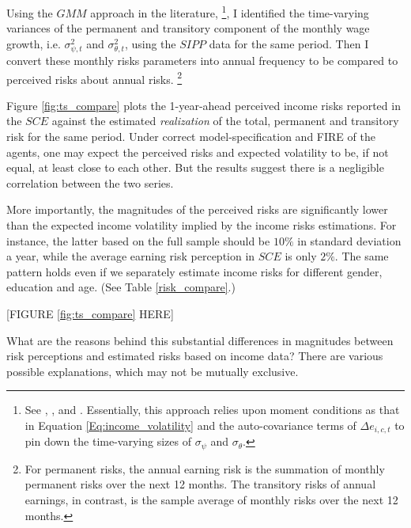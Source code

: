 Using the $GMM$ approach in the literature, \footnote{See \cite{carroll1997nature}, \cite{meghir2004income}, and \cite{blundell_consumption_2008}. Essentially, this approach relies upon moment conditions as that in Equation \ref{Eq:income_volatility} and the auto-covariance terms of $\Delta e_{i,c,t}$ to pin down the time-varying sizes of $\sigma_{\psi}$ and $\sigma_{\theta}$.}, I identified the time-varying variances of the permanent and transitory component of the monthly wage growth, i.e. $\sigma^2_{\psi,t}$ and $\sigma^2_{\theta,t}$, using the $SIPP$ data for the same period. Then I convert these monthly risks parameters into annual frequency to be compared to perceived risks about annual risks. \footnote{For permanent risks, the annual earning risk is the summation of monthly permanent risks over the next 12 months. The transitory risks of annual earnings, in contrast, is the sample average of monthly risks over the next 12 months.}


Figure \ref{fig:ts_compare} plots the 1-year-ahead perceived income risks reported in the $SCE$ against the estimated \emph{realization} of the total, permanent and transitory risk for the same period. Under correct model-specification and FIRE of the agents, one may expect the perceived risks and expected volatility to be, if not equal, at least close to each other. But the results suggest there is a negligible correlation between the two series. 

More importantly, the magnitudes of the perceived risks are significantly lower than the expected income volatility implied by the income risks estimations. For instance, the latter based on the full sample should be $10\%$ in standard deviation a year, while the average earning risk perception in $SCE$ is only $2\%$. The same pattern holds even if we separately estimate income risks for different gender, education and age. (See Table \ref{risk_compare}.)

\begin{center}
[FIGURE \ref{fig:ts_compare} HERE]
\end{center}


What are the reasons behind this substantial differences in magnitudes between risk perceptions and estimated risks based on income data? There are various possible explanations, which may not be mutually exclusive. 

